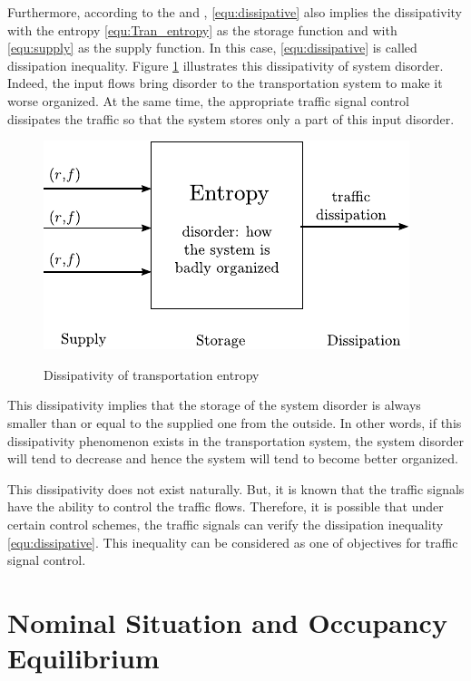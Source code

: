 \documentclass[preprint,authoryear,12pt]{elsarticle}
\begin{document}
Furthermore, according to the \citet{willems_dissipative_1972} and
\citet{hill_dissipative_1980}, \eqref{equ:dissipative} also implies
the dissipativity with the entropy \eqref{equ:Tran_entropy} as the
storage function and with \eqref{equ:supply} as the supply function.
In this case, \eqref{equ:dissipative} is called dissipation
inequality. Figure \ref{fig:trans_dis} illustrates this dissipativity
of system disorder. Indeed, the input flows bring disorder to the
transportation system to make it worse organized. At the same time,
the appropriate traffic signal control dissipates the traffic so that
the system stores only a part of this input disorder.
\begin{figure}[ht]
  \centering
  \includegraphics{pics/trans_dis}\\
  \caption{Dissipativity of transportation entropy}
  \label{fig:trans_dis}
\end{figure}

This dissipativity implies that the storage of the system disorder is
always smaller than or equal to the supplied one from the outside. In
other words, if this dissipativity phenomenon exists in the
transportation system, the system disorder will tend to decrease and
hence the system will tend to become better organized.

This dissipativity does not exist naturally. But, it is known that
the traffic signals have the ability to control the traffic flows.
Therefore, it is possible that under certain control schemes, the
traffic signals can verify the dissipation inequality
\eqref{equ:dissipative}. This inequality can be considered as one of
objectives for traffic signal control.

\section{Nominal Situation and Occupancy Equilibrium}\label{sec:nominal}
\end{document}
